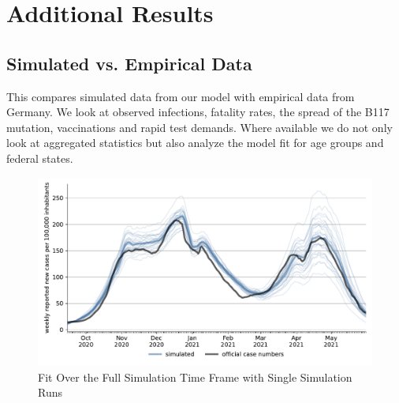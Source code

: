 \section{Additional Results}
\label{sec:additional_results}

\subsection{Simulated vs. Empirical Data}
\label{subsec:fit_results}

This compares simulated data from our model with empirical data from Germany. We look at
observed infections, fatality rates, the spread of the B117 mutation, vaccinations and
rapid test demands. Where available we do not only look at aggregated statistics but also
analyze the model fit for age groups and federal states.


\begin{figure}[ht]
  \centering
  \includegraphics[width=\textwidth]{../figures/results/figures/scenario_comparisons/combined_fit/full_new_known_case_with_single_runs}
  \caption{Fit Over the Full Simulation Time Frame with Single Simulation Runs}
  \label{fig:aggregated_fit2}
\end{figure}

